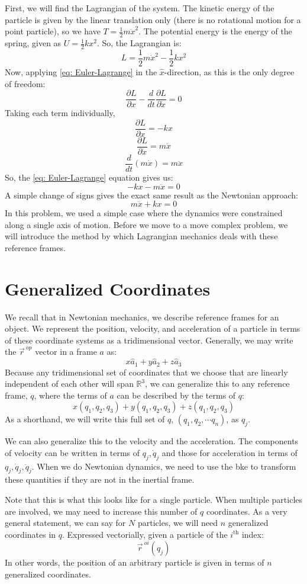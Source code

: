 \documentclass[12pt]{report}
\begin{document}
First, we will find the \gls{Lagrangian} of the system. The kinetic energy of the particle is given by the linear translation only (there is no rotational motion for a point particle), so we have $T=\frac{1}{2}m\dot{x}^2$. The potential energy is the energy of the spring, given as $U=\frac{1}{2}kx^2$. So, the \gls{Lagrangian} is:
$$L=\frac{1}{2}m\dot{x}^2-\frac{1}{2}kx^2$$
Now, applying \eqref{eq: Euler-Lagrange} in the $\hat{x}$-direction, as this is the only degree of freedom:
$$\frac{\partial L}{\partial x}-\frac{d}{dt}\frac{\partial L}{\partial \dot{x}}=0$$
Taking each term individually,
$$\frac{\partial L}{\partial x}=-kx$$
$$\frac{\partial L}{\partial \dot{x}}=m\dot{x}$$
$$\frac{d}{dt}\left(m\dot{x}\right)=m\ddot{x}$$
So, the \eqref{eq: Euler-Lagrange} equation gives us:
$$-kx-m\ddot{x}=0$$
A simple change of signs gives the exact same result as the Newtonian approach:
$$m\ddot{x}+kx=0$$
In this problem, we used a simple case where the dynamics were constrained along a single axis of motion. Before we move to a move complex problem, we will introduce the method by which \gls{Lagrangian} mechanics deals with these reference frames.
\section{Generalized Coordinates}
We recall that in Newtonian mechanics, we describe reference frames for an object. We represent the position, velocity, and acceleration of a particle in terms of these coordinate systems as a tridimensional vector. 
Generally, we may write the $\vec{r}^{\ op}$  vector in a frame $a$ as:
$$x\hat{a}_1+y\hat{a}_2+z\hat{a}_3$$
Because any tridimensional set of coordinates that we choose that are linearly independent of each other will span $\mathbb{R}^3$, we can generalize this to any reference frame, $q$, where the terms of $a$ can be described by the terms of $q$:
$$x\left(q_1,q_2,q_3\right)+y\left(q_1,q_2,q_3\right)+z\left(q_1,q_2,q_3\right)$$
As a shorthand, we will write this full set of $q$, $\left(q_1,q_2,\cdots q_n\right)$, as $q_j$.

We can also generalize this to the velocity and the acceleration. The components of velocity can be written in terms of $q_j, \dot{q}_j$ and those for acceleration in terms of $q_j, \dot{q}_j, \ddot{q}_j$.  When we do Newtonian dynamics, we need to use the \gls{bke} to transform these quantities if they are not in the \gls{inertial frame}.

Note that this is what this looks like for a single particle. When multiple particles are involved, we may need to increase this number of $q$ coordinates. As a very general statement, we can say for $N$ particles, we will need $n$ generalized coordinates in $q$. Expressed vectorially, given a particle of the $i^{\mathrm{th}}$ index:
$$\vec{r}^{\ oi}(q_j)$$
In other words, the position of an arbitrary particle is given in terms of $n$ generalized coordinates. 
\end{document}
